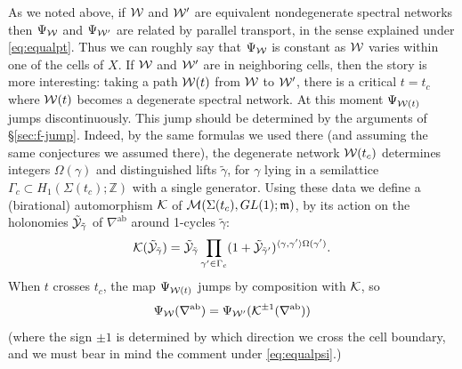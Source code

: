 \documentclass[11pt,a4paper]{article}
\def\IZ{{\mathbb{Z}}}
\def\CM {{\cal M}}
\def\CK {{\cal K}}
\def\wnet {{\cal W}}
\def\CY {{\cal Y}}
\def\CK{{\cal K}}
\def\ab{{\mathrm{ab}}}
\def\fm{\mathfrak{m}}
\def\IZ{{\mathbb{Z}}}
\def\CM {{\cal M}}
\def\CK {{\cal K}}
\def\wnet {{\cal W}}
\def\CY {{\cal Y}}
\def\CK{{\cal K}}
\newcommand{\inprod}[1]{\langle#1\rangle}
\begin{document}
As we noted above, if $\wnet$ and $\wnet'$ are equivalent
nondegenerate spectral networks then
$\Psi_{\wnet}$ and $\Psi_{\wnet'}$ are related by parallel transport, in the sense
explained under \eqref{eq:equalpt}.
Thus we can roughly say that $\Psi_\wnet$ is constant as $\wnet$ varies within one of
the cells of $X$.  If $\wnet$ and $\wnet'$ are in neighboring cells, then the story is
more interesting:  taking a path $\wnet(t)$ from $\wnet$ to $\wnet'$, there is a critical
$t = t_c$ where $\wnet(t)$ becomes a degenerate spectral network.
At this moment $\Psi_{\wnet(t)}$ jumps discontinuously.  This jump should be determined by the arguments of \S\ref{sec:f-jump}.
Indeed, by the same formulas we used there (and assuming the same conjectures we
assumed there), the degenerate network $\wnet(t_c)$ determines integers $\Omega(\gamma)$
and distinguished lifts $\tilde\gamma$,
for $\gamma$ lying in a semilattice $\Gamma_c \subset H_1(\Sigma(t_c); \IZ)$ with a single generator.
Using these data we define a (birational) automorphism $\CK$ of
$\CM(\Sigma(t_c), GL(1); \fm)$, by its action on the holonomies $\tilde\CY_{\tilde\gamma}$
of $\nabla^\ab$ around 1-cycles $\tilde\gamma$:
\begin{equation} \label{eq:holonomy-jump}
 \CK(\tilde\CY_{\tilde\gamma}) =\tilde \CY_{\tilde\gamma} \prod_{\gamma' \in \Gamma_c}
 (1 + \tilde \CY_{\tilde\gamma'})^{\inprod{\gamma,\gamma'} \Omega(\gamma')}.
\end{equation}
When $t$ crosses $t_c$, the map $\Psi_{\wnet(t)}$ jumps by composition with $\CK$, so
\begin{equation}
\Psi_{\wnet}(\nabla^\ab) = \Psi_{\wnet'}(\CK^{\pm 1}(\nabla^{\ab}))
\end{equation}
(where the sign $\pm 1$ is determined by which direction we cross the cell boundary, and
we must bear in mind the comment under \eqref{eq:equalpsi}.)
\end{document}
